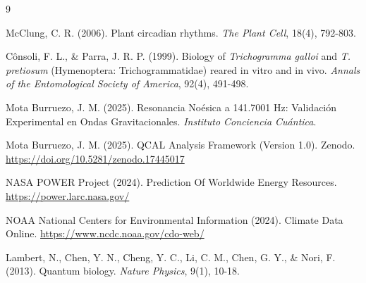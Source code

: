\documentclass[11pt,a4paper]{article}
\begin{document}

\begin{thebibliography}{9}

McClung, C. R. (2006).
\newblock Plant circadian rhythms.
\newblock \textit{The Plant Cell}, 18(4), 792-803.

Cônsoli, F. L., \& Parra, J. R. P. (1999).
\newblock Biology of \textit{Trichogramma galloi} and \textit{T. pretiosum} (Hymenoptera: Trichogrammatidae) reared in vitro and in vivo.
\newblock \textit{Annals of the Entomological Society of America}, 92(4), 491-498.

Mota Burruezo, J. M. (2025).
\newblock Resonancia Noésica a 141.7001 Hz: Validación Experimental en Ondas Gravitacionales.
\newblock \textit{Instituto Conciencia Cuántica}.

Mota Burruezo, J. M. (2025).
\newblock QCAL Analysis Framework (Version 1.0).
\newblock Zenodo. \url{https://doi.org/10.5281/zenodo.17445017}

NASA POWER Project (2024).
\newblock Prediction Of Worldwide Energy Resources.
\newblock \url{https://power.larc.nasa.gov/}

NOAA National Centers for Environmental Information (2024).
\newblock Climate Data Online.
\newblock \url{https://www.ncdc.noaa.gov/cdo-web/}

Lambert, N., Chen, Y. N., Cheng, Y. C., Li, C. M., Chen, G. Y., \& Nori, F. (2013).
\newblock Quantum biology.
\newblock \textit{Nature Physics}, 9(1), 10-18.

\end{thebibliography}
\end{document}

